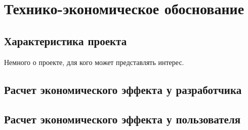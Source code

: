 \section{Технико-экономическое обоснование}

\subsection{Характеристика проекта}
Немного о проекте, для кого может представлять интерес.

\subsection{Расчет экономического эффекта у разработчика}

\subsection{Расчет экономического эффекта у пользователя}
